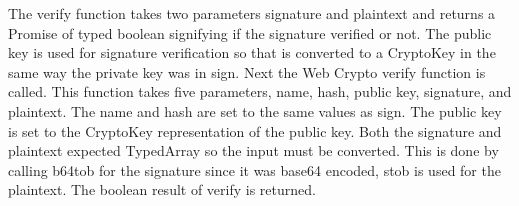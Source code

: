 The verify function takes two parameters signature and plaintext and returns a Promise of typed boolean signifying if the signature verified or not. The public key is used for signature verification so that is converted to a CryptoKey in the same way the private key was in sign. Next the Web Crypto verify function is called. This function takes five parameters, name, hash, public key, signature, and plaintext. The name and hash are set to the same values as sign. The public key is set to the CryptoKey representation of the public key. Both the signature and plaintext expected TypedArray so the input must be converted. This is done by calling b64tob for the signature since it was base64 encoded, stob is used for the plaintext. The boolean result of verify is returned.
 
